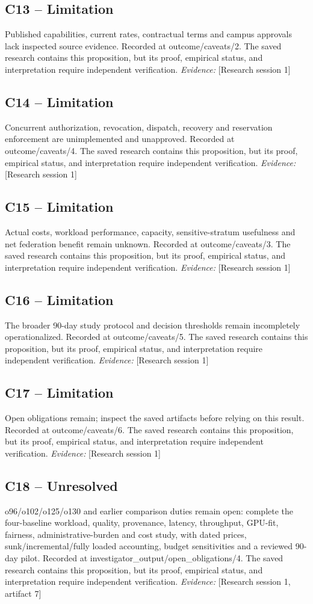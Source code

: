\documentclass[11pt]{article}
\begin{document}
\subsection{C13 -- Limitation}
Published capabilities, current rates, contractual terms and campus approvals lack inspected source evidence.
Recorded at outcome/caveats/2. The saved research contains this proposition, but its proof, empirical status, and interpretation require independent verification.
\textit{Evidence: }[Research session 1]
\subsection{C14 -- Limitation}
Concurrent authorization, revocation, dispatch, recovery and reservation enforcement are unimplemented and unapproved.
Recorded at outcome/caveats/4. The saved research contains this proposition, but its proof, empirical status, and interpretation require independent verification.
\textit{Evidence: }[Research session 1]
\subsection{C15 -- Limitation}
Actual costs, workload performance, capacity, sensitive-stratum usefulness and net federation benefit remain unknown.
Recorded at outcome/caveats/3. The saved research contains this proposition, but its proof, empirical status, and interpretation require independent verification.
\textit{Evidence: }[Research session 1]
\subsection{C16 -- Limitation}
The broader 90-day study protocol and decision thresholds remain incompletely operationalized.
Recorded at outcome/caveats/5. The saved research contains this proposition, but its proof, empirical status, and interpretation require independent verification.
\textit{Evidence: }[Research session 1]
\subsection{C17 -- Limitation}
Open obligations remain; inspect the saved artifacts before relying on this result.
Recorded at outcome/caveats/6. The saved research contains this proposition, but its proof, empirical status, and interpretation require independent verification.
\textit{Evidence: }[Research session 1]
\subsection{C18 -- Unresolved}
o96/o102/o125/o130 and earlier comparison duties remain open: complete the four-baseline workload, quality, provenance, latency, throughput, GPU-fit, fairness, administrative-burden and cost study, with dated prices, sunk/incremental/fully loaded accounting, budget sensitivities and a reviewed 90-day pilot.
Recorded at investigator\_output/open\_obligations/4. The saved research contains this proposition, but its proof, empirical status, and interpretation require independent verification.
\textit{Evidence: }[Research session 1, artifact 7]
\end{document}
